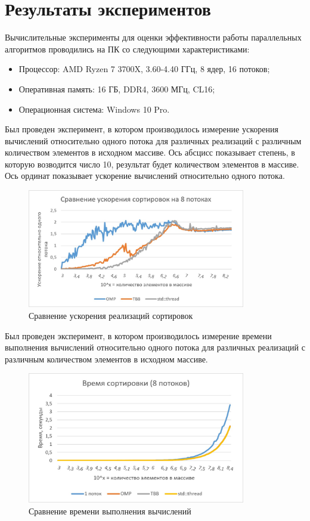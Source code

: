 \documentclass{report}
\begin{document}
\section*{Результаты экспериментов}
Вычислительные эксперименты для оценки эффективности работы параллельных алгоритмов проводились на ПК со следующими характеристиками:
\begin{itemize}
    \item Процессор: AMD Ryzen 7 3700X, 3.60-4.40 ГГц, 8 ядер, 16 потоков;
    \item Оперативная память: 16 ГБ, DDR4, 3600 МГц, CL16;
    \item Операционная система: Windows 10 Pro.
\end{itemize}
\par Был проведен эксперимент, в котором производилось измерение ускорения вычислений относительно одного потока для различных реализаций с различным количеством элементов в исходном массиве. Ось абсцисс показывает степень, в которую возводится число 10, результат будет количеством элементов в массиве. Ось ординат показывает ускорение вычислений относительно одного потока.
\begin{figure}[H]
    \centering
    \includegraphics[width=0.85\textwidth]{../../modules/task_1/ivanov_arkady_rbms/images/boost_comparsion_8thrd.jpg}
    \caption{Сравнение ускорения реализаций сортировок}
    \label{fig:my_label_1}
\end{figure}
\par Был проведен эксперимент, в котором производилось измерение времени выполнения вычислений относительно одного потока для различных реализаций с различным количеством элементов в исходном массиве.
\begin{figure}[H]
    \centering
    \includegraphics[width=0.85\textwidth]{../../modules/task_1/ivanov_arkady_rbms/images/sort_time_8thrd.jpg}
    \caption{Сравнение времени выполнения вычислений}
    \label{fig:my_label_2}
\end{figure}
\end{document}
